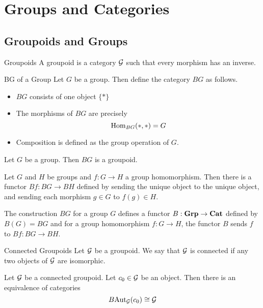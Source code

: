 \documentclass[a4paper]{article}
\begin{document}
\pagebreak
\section{Groups and Categories}
\subsection{Groupoids and Groups}
\begin{defn}{Groupoids}{} A groupoid is a category $\mathcal{G}$ such that every morphism has an inverse. 
\end{defn}

\begin{defn}{BG of a Group}{} Let $G$ be a group. Then define the category $BG$ as follows. 
\begin{itemize}
\item $BG$ consists of one object $\{\ast\}$
\item The morphisms of $BG$ are precisely $$\operatorname{Hom}_{BG}(\ast,\ast)=G$$
\item Composition is defined as the group operation of $G$. 
\end{itemize}
\end{defn}

\begin{lmm}{}{} Let $G$ be a group. Then $BG$ is a groupoid. 
\end{lmm}

\begin{prp}{}{} Let $G$ and $H$ be groups and $f:G\to H$ a group homomorphism. Then there is a functor $Bf:BG\to BH$ defined by sending the unique object to the unique object, and sending each morphism $g\in G$ to $f(g)\in H$. 
\end{prp}

\begin{prp}{}{} The construction $BG$ for a group $G$ defines a functor $B:\bold{Grp}\to\bold{Cat}$ defined by $B(G)=BG$ and for a group homomorphism $f:G\to H$, the functor $B$ sends $f$ to $Bf:BG\to BH$. 
\end{prp}

\begin{defn}{Connected Groupoids}{} Let $\mathcal{G}$ be a groupoid. We say that $\mathcal{G}$ is connected if any two objects of $\mathcal{G}$ are isomorphic. 
\end{defn}

\begin{prp}{}{} Let $\mathcal{G}$ be a connected groupoid. Let $c_0\in\mathcal{G}$ be an object. Then there is an equivalence of categories $$B\text{Aut}_{\mathcal{G}}(c_0)\cong\mathcal{G}$$
\end{prp}
\end{document}

